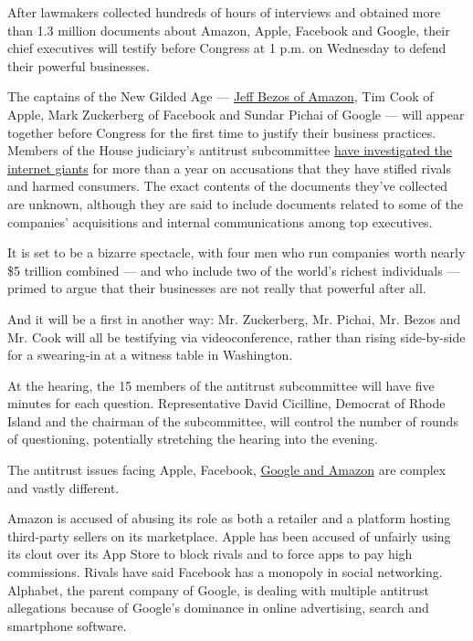 After lawmakers collected hundreds of hours of interviews and obtained
more than 1.3 million documents about Amazon, Apple, Facebook and
Google, their chief executives will testify before Congress at 1 p.m. on
Wednesday to defend their powerful businesses.

The captains of the New Gilded Age ---
\href{https://www.nytimes3xbfgragh.onion/2020/07/27/business/jeff-bezos-amazon-congress.html}{Jeff
Bezos of Amazon}, Tim Cook of Apple, Mark Zuckerberg of Facebook and
Sundar Pichai of Google --- will appear together before Congress for the
first time to justify their business practices. Members of the House
judiciary's antitrust subcommittee
\href{https://www.nytimes3xbfgragh.onion/2019/06/11/technology/antitrust-hearing.html}{have
investigated the internet giants} for more than a year on accusations
that they have stifled rivals and harmed consumers. The exact contents
of the documents they've collected are unknown, although they are said
to include documents related to some of the companies' acquisitions and
internal communications among top executives.

It is set to be a bizarre spectacle, with four men who run companies
worth nearly \$5 trillion combined --- and who include two of the
world's richest individuals --- primed to argue that their businesses
are not really that powerful after all.

And it will be a first in another way: Mr. Zuckerberg, Mr. Pichai, Mr.
Bezos and Mr. Cook will all be testifying via videoconference, rather
than rising side-by-side for a swearing-in at a witness table in
Washington.

At the hearing, the 15 members of the antitrust subcommittee will have
five minutes for each question. Representative David Cicilline, Democrat
of Rhode Island and the chairman of the subcommittee, will control the
number of rounds of questioning, potentially stretching the hearing into
the evening.

The antitrust issues facing Apple, Facebook,
\href{https://www.nytimes3xbfgragh.onion/2019/06/02/business/google-antitrust-investigation.html}{Google
and Amazon} are complex and vastly different.

Amazon is accused of abusing its role as both a retailer and a platform
hosting third-party sellers on its marketplace. Apple has been accused
of unfairly using its clout over its App Store to block rivals and to
force apps to pay high commissions. Rivals have said Facebook has a
monopoly in social networking. Alphabet, the parent company of Google,
is dealing with multiple antitrust allegations because of Google's
dominance in online advertising, search and smartphone software.

